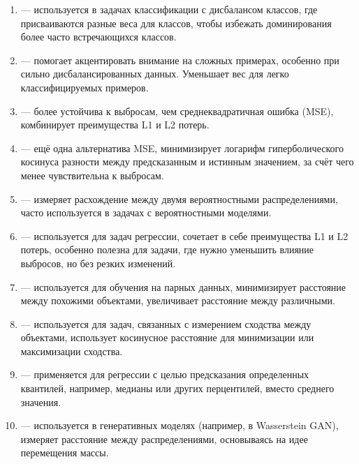 \begin{enumerate}
    \item {} — используется в задачах классификации с дисбалансом классов, где присваиваются разные веса для классов, чтобы избежать доминирования более часто встречающихся классов.

    \item {} — помогает акцентировать внимание на сложных примерах, особенно при сильно дисбалансированных данных. Уменьшает вес для легко классифицируемых примеров.

    \item {} — более устойчива к выбросам, чем среднеквадратичная ошибка (MSE), комбинирует преимущества L1 и L2 потерь.

    \item {} — ещё одна альтернатива MSE, минимизирует логарифм гиперболического косинуса разности между предсказанным и истинным значением, за счёт чего менее чувствительна к выбросам.

    \item {} — измеряет расхождение между двумя вероятностными распределениями, часто используется в задачах с вероятностными моделями.

    \item {} — используется для задач регрессии, сочетает в себе преимущества L1 и L2 потерь, особенно полезна для задачи, где нужно уменьшить влияние выбросов, но без резких изменений.

    \item {} — используется для обучения на парных данных, минимизирует расстояние между похожими объектами, увеличивает расстояние между различными.

    \item {} — используется для задач, связанных с измерением сходства между объектами, использует косинусное расстояние для минимизации или максимизации сходства.

    \item {} — применяется для регрессии с целью предсказания определенных квантилей, например, медианы или других перцентилей, вместо среднего значения.

    \item {} — используется в генеративных моделях (например, в Wasserstein GAN), измеряет расстояние между распределениями, основываясь на идее перемещения массы.


\end{enumerate}
